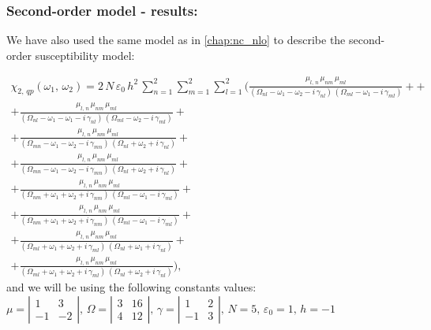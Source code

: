 \documentclass[12pt,twoside,a4paper]{article}
\numberwithin{equation}{subsection}
\numberwithin{figure}{subsection}
\begin{document}
\subsubsection*{Second-order model - results:}

We have also used the same model as in \ref{chap:nc_nlo} to describe the second-order susceptibility model:

\begin{multline} \label{eq:hht_qp2}
  \chi_{2, \,qp}({\omega_{1}}, \,{\omega_{2}}) 
  = 2\, N\,\varepsilon_{0}\,h^{2}\,\sum_{n=1}^{2}\sum_{m=1}^{2}\sum_{l=1}^{2}
  (      \frac {{\mu_{l,\,n}}\,{\mu_{nm}}\,{\mu_{ml}}}
      {({\Omega_{nl}} - \omega_1 - \omega_2 - i\,{\gamma_{nl}})\,({\Omega_{ml}} - \omega_1 - i\,{\gamma_{ml}})} +
  + \\ + \frac   {{\mu_{l, \,n}}\,{\mu_{nm}}\,{\mu_{ml}}}
      {({\Omega_{nl}} - \omega_1 - \omega_1 - i\,{\gamma_{nl}})\,({\Omega_{ml}} - \omega_2 - i\,{\gamma_{ml}})}
  + \\ + \frac   {{\mu_{l, \,n}}\,{\mu_{nm}}\,{\mu_{ml}}}
      {({\Omega_{mn}} - \omega_1 - \omega_2 - i\,{\gamma_{mn}})\,({\Omega_{nl}} + \omega_2 + i\,{\gamma_{nl}})}
  + \\ + \frac{{\mu_{l, \,n }}\,{\mu_{nm}}\,{\mu_{ml}}} 
      {({\Omega_{mn}} - \omega_1 - \omega_2 - i\,{\gamma_{mn}})\,({\Omega_{nl}} + \omega_2 + i\,{\gamma_{nl}})} 
  + \\ + \frac   {{\mu_{l, \,n}}\,{\mu_{nm}}\,{\mu_{ml}}}
      {({\Omega_{nm}} + \omega_1 + \omega_2 + i\,{\gamma_{nm}})\,({\Omega_{ml}} - \omega_1 - i\,{\gamma_{ml}})}
  + \\ + \frac {{\mu_{l, \,n}}\,{\mu_{ nm}}\,{\mu_{ml}}}
      {({\Omega_{nm}} + \omega_1 + \omega_2 + i\,{\gamma_{nm}})\,({\Omega_{ml}} - \omega_1 - i\,{\gamma_{ml}})} 
  + \\ + \frac {{\mu_{l, \,n}}\,{\mu_{nm}}\,{\mu_{ml}}}
      {({\Omega_{ml}} + \omega_1 + \omega_2 + i\,{\gamma_{ml}})\,({\Omega_{nl}} + \omega_1 + i\,{\gamma_{nl}})}
  + \\ + \frac {{\mu_{l, \,n}}\,{\mu_{nm}}\,{\mu_{ml}}}
      {({\Omega_{ml}} + \omega_1 + \omega_2 + i\,{\gamma_{ml}})\,({\Omega_{nl}} + \omega_2 + i\,{\gamma_{nl}})}
  ) ,
\end{multline}
and we will be using the following constants values: \\
$\mu = \left| \begin{array}{cc} 
    1 & 3 \\ -1 & -2 
  \end{array} \right|,\, 
  \Omega = \left| \begin{array}{cc} 
    3 & 16 \\ 4 & 12 
  \end{array} \right|,\,
  \gamma = \left| \begin{array}{cc} 
  1 & 2 \\ -1 & 3
  \end{array} \right|,\, N=5,\, {\varepsilon_{0}}=1,\,h= - 1$
\end{document}
